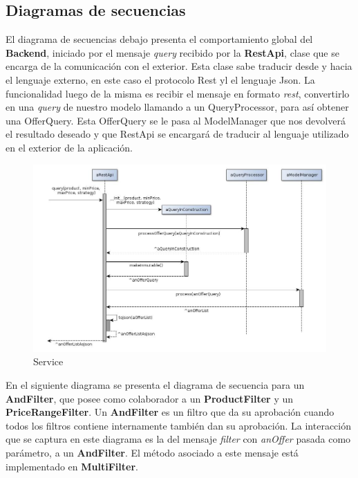 \documentclass[10pt, a4paper]{article}
\begin{document}
\begin{landscape}
\subsection{Diagramas de secuencias}

El diagrama de secuencias debajo presenta el comportamiento global del \textbf{Backend}, iniciado por el mensaje \emph{query} recibido por la \textbf{RestApi}, clase que se encarga de la comunicación con el exterior. Esta clase sabe traducir desde y hacia el lenguaje externo, en este caso el protocolo \textsf{Rest} yl el lenguaje \textsf{Json}. La funcionalidad luego de la misma es recibir el mensaje en formato \emph{rest}, convertirlo en una \emph{query} de nuestro modelo llamando a un \textsf{QueryProcessor}, para así obtener una \textsf{OfferQuery}. Esta \textsf{OfferQuery} se le pasa al \textsf{ModelManager} que nos devolverá el resultado deseado y que \textsf{RestApi} se encargará de traducir al lenguaje utilizado en el exterior de la aplicación.
\begin{figure}[H]
\centering
\includegraphics[scale=0.60]{graphics/service_sequence.jpg}
\caption{Service}
\end{figure}
\end{landscape}

\newpage

En el siguiente diagrama se presenta el diagrama de secuencia para un \textbf{AndFilter}, que posee como colaborador a un \textbf{ProductFilter} y un \textbf{PriceRangeFilter}. Un \textbf{AndFilter} es un filtro que da su aprobación cuando todos los filtros contiene internamente también dan su aprobación. La interacción que se captura en este diagrama es la del mensaje \emph{filter} con \emph{anOffer} pasada como parámetro, a un \textbf{AndFilter}. El método asociado a este mensaje está implementado en \textbf{MultiFilter}. 
\end{document}
